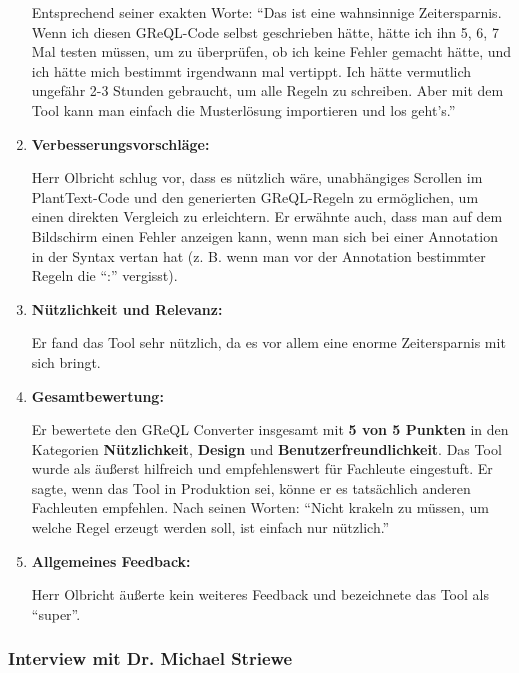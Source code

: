 \begin{enumerate}[itemsep=8pt, parsep=5pt]
    Entsprechend seiner exakten Worte: ``Das ist eine wahnsinnige Zeitersparnis. Wenn ich diesen GReQL-Code selbst
    geschrieben hätte, hätte ich ihn 5, 6, 7 Mal testen müssen, um zu überprüfen, ob ich keine Fehler gemacht hätte,
    und ich hätte mich bestimmt irgendwann mal vertippt. Ich hätte vermutlich ungefähr 2-3 Stunden gebraucht, um alle
    Regeln zu schreiben. Aber mit dem Tool kann man einfach die Musterlösung importieren und los geht's.''

    \item \textbf{Verbesserungsvorschläge:}

    Herr Olbricht schlug vor, dass es nützlich wäre, unabhängiges Scrollen im PlantText-Code und den generierten
    GReQL-Regeln zu ermöglichen, um einen direkten Vergleich zu erleichtern. Er erwähnte auch, dass man auf dem
    Bildschirm einen Fehler anzeigen kann, wenn man sich bei einer Annotation in der Syntax vertan hat
    (z. B. wenn man vor der Annotation bestimmter Regeln die ``:'' vergisst).

    \item \textbf{Nützlichkeit und Relevanz:}

    Er fand das Tool sehr nützlich, da es vor allem eine enorme Zeitersparnis mit sich bringt.
    
    \item \textbf{Gesamtbewertung:}

    Er bewertete den GReQL Converter insgesamt mit \textbf{5 von 5 Punkten} in den Kategorien \textbf{Nützlichkeit},
    \textbf{Design} und \textbf{Benutzerfreundlichkeit}. Das Tool wurde als äußerst hilfreich und empfehlenswert für 
    Fachleute eingestuft. Er sagte, wenn das Tool in Produktion sei, könne er es tatsächlich anderen Fachleuten
    empfehlen. Nach seinen Worten: ``Nicht krakeln zu müssen, um welche Regel erzeugt werden soll, ist einfach nur
    nützlich.''

    \item \textbf{Allgemeines Feedback:}

    Herr Olbricht äußerte kein weiteres Feedback und bezeichnete das Tool als ``super''.
\end{enumerate}

\subsubsection{Interview mit Dr. Michael Striewe}

